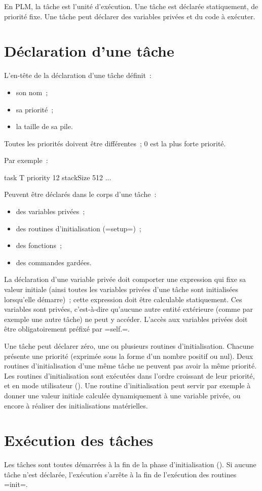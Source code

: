 





En PLM, la tâche est l'unité d'exécution. Une tâche est déclarée statiquement, de priorité fixe. Une tâche peut déclarer des variables privées et du code à exécuter.


\section{Déclaration d'une tâche}

L'en-tête de la déclaration d'une tâche définit~:
\begin{itemize}
  \item son nom~;
  \item sa priorité~;
  \item la taille de sa pile.
\end{itemize}

Toutes les priorités doivent être différentes~; $0$ est la plus forte priorité.

Par exemple~:
\begin{PLM}
task T priority 12 stackSize 512 {
  ...
}
\end{PLM}

Peuvent être déclarés dans le corps d'une tâche~:
\begin{itemize}
  \item des variables privées~;
  \item des routines d'initialisation (\plm=setup=)~;
  \item des fonctions~;
  \item des commandes gardées.
\end{itemize}

La déclaration d'une variable privée doit comporter une expression qui fixe sa valeur initiale (ainsi toutes les variables privées d'une tâche sont initialisées lorsqu'elle démarre)~; cette expression doit être calculable statiquement. Ces variables sont privées, c'est-à-dire qu'aucune autre entité extérieure (comme par exemple une autre tâche) ne peut y accéder. L'accès aux variables privées doit être obligatoirement préfixé par \plm=self.=.

Une tâche peut déclarer zéro, une ou plusieurs routines d'initialisation. Chacune présente une priorité (exprimée sous la forme d'un nombre positif ou nul). Deux routines d'initialisation d'une même tâche ne peuvent pas avoir la même priorité. Les routines d'initialisation sont exécutées dans l'ordre croissant de leur priorité, et en mode utilisateur (). Une routine d'initialisation peut servir par exemple à donner une valeur initiale calculée dynamiquement à une variable privée, ou encore à réaliser des initialisations matérielles.


\section{Exécution des tâches}

Les tâches sont toutes démarrées à la fin de la phase d'initialisation (). Si aucune tâche n'est déclarée, l'exécution s'arrête à la fin de l'exécution des routines \plm=init=.


